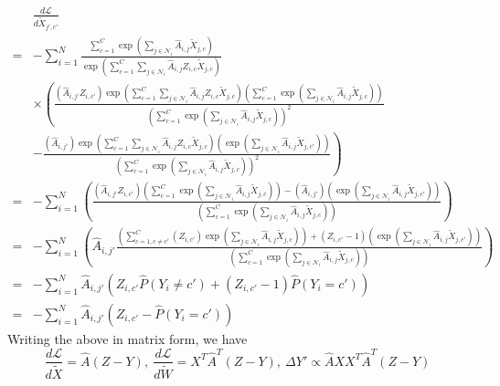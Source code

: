 \documentclass{article}
\newcommand{\0}{{\boldsymbol{0}}}
\newcommand{\6}{{\partial}}
\newcommand{\8}{{\infty}}
\newcommand{\4}{{\nabla}}
\begin{document}
\begin{align*}
    &\frac{d \mathcal{L}}{d \tilde{X}_{j',c'}} \\
     = & - \sum\limits_{i=1}^N \frac{\sum\limits_{c=1}^C \exp(\sum\limits_{j\in \mathcal{N}_i} \hat{A}_{i,j} \tilde{X}_{j,c}) }{\exp \left(\sum\limits_{c=1}^C \sum\limits_{j\in \mathcal{N}_i} \hat{A}_{i,j} Z_{i,c}\tilde{X}_{j,c}\right) } \\ 
& \times \left( \frac{ \left( \hat{A}_{i,j'} Z_{i,c'}  \right) \exp \left(\sum\limits_{c=1}^C \sum\limits_{j\in \mathcal{N}_i} \hat{A}_{i,j} Z_{i,c}\tilde{X}_{j,c}\right) \left(\sum\limits_{c=1}^C \exp(\sum\limits_{j\in \mathcal{N}_i} \hat{A}_{i,j} \tilde{X}_{j,c}) \right) }{ \left(\sum\limits_{c=1}^C \exp(\sum\limits_{j\in \mathcal{N}_i} \hat{A}_{i,j} \tilde{X}_{j,c}) \right)^2} \right.\\
    &\left. - \frac{\left( \hat{A}_{i,j'} \right) \exp \left(\sum\limits_{c=1}^C \sum\limits_{j\in \mathcal{N}_i} \hat{A}_{i,j} Z_{i,c}\tilde{X}_{j,c}\right) \left( \exp(\sum\limits_{j\in \mathcal{N}_i} \hat{A}_{i,j} \tilde{X}_{j,c'}) \right) }{ \left(\sum\limits_{c=1}^C \exp(\sum\limits_{j\in \mathcal{N}_i} \hat{A}_{i,j} \tilde{X}_{j,c}) \right)^2} \right) \\
     =&  - \sum\limits_{i=1}^N \left( \frac{ \left( \hat{A}_{i,j'} Z_{i,c'}  \right) \left(\sum\limits_{c=1}^C \exp(\sum\limits_{j\in \mathcal{N}_i} \hat{A}_{i,j} \tilde{X}_{j,c}) \right) - \left( \hat{A}_{i,j'} \right) \left( \exp(\sum\limits_{j\in \mathcal{N}_i} \hat{A}_{i,j} \tilde{X}_{j,c'}) \right)}{ \left(\sum\limits_{c=1}^C \exp(\sum\limits_{j\in \mathcal{N}_i} \hat{A}_{i,j} \tilde{X}_{j,c}) \right)} \right)\\
     = & - \sum\limits_{i=1}^N \left( \hat{A}_{i,j'}  \frac{\left(\sum\limits_{c=1, c\neq c'}^C (Z_{i,c'}) \exp(\sum\limits_{j\in \mathcal{N}_i} \hat{A}_{i,j} \tilde{X}_{j,c}) \right) +  \left( Z_{i,c'}-1 \right) \left( \exp(\sum\limits_{j\in \mathcal{N}_i} \hat{A}_{i,j} \tilde{X}_{j,c'}) \right)}{ \left(\sum\limits_{c=1}^C \exp(\sum\limits_{j\in \mathcal{N}_i} \hat{A}_{i,j} \tilde{X}_{j,c}) \right)} \right)\\
     =& - \sum\limits_{i=1}^N \hat{A}_{i,j'} \left( Z_{i,c'} \hat{P}(Y_i \neq c') + (Z_{i,c'} - 1) \hat{P} (Y_i = c') \right)\\
     = & - \sum\limits_{i=1}^N \hat{A}_{i,j'} \left( Z_{i,c'} - \hat{P} (Y_i = c') \right)
    \end{align*}
Writing the above in matrix form, we have
\begin{equation}
    \frac{d \mathcal{L}}{d \tilde{X} } = \hat{A}(Z- Y), \  \frac{d \mathcal{L}}{d \tilde{W} } = X^T \hat{A}^T (Z-Y), \ \Delta Y' \propto \hat{A}XX^T\hat{A}^T(Z-Y)
\end{equation}
\iffalse
\end{document}
